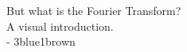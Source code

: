 \documentclass[preview]{standalone}
\begin{document}
\begin{center}
But what is the Fourier Transform?\\A visual introduction.\\- 3blue1brown
\end{center}
\end{document}
